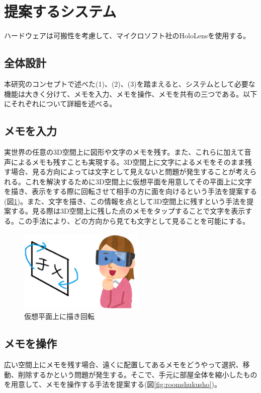 \documentclass[twocolumn, a4paper]{UECIEresume}
\begin{document}
\section{提案するシステム}
ハードウェアは可搬性を考慮して、マイクロソフト社のHoloLens\cite{tex6}を使用する。

\subsection{全体設計}
本研究のコンセプトで述べた(1)、(2)、(3)を踏まえると、システムとして必要な機能は大きく分けて、メモを入力、メモを操作、メモを共有の三つである。以下にそれぞれについて詳細を述べる。

\subsection{メモを入力}
実世界の任意の3D空間上に図形や文字のメモを残す。また、これらに加えて音声によるメモも残すことも実現する。3D空間上に文字によるメモをそのまま残す場合、見る方向によっては文字として見えないと問題が発生することが考えられる。これを解決するために3D空間上に仮想平面を用意してその平面上に文字を描き、表示をする際に回転させて相手の方に面を向けるという手法を提案する(図\ref{fig:memokaiten})。また、文字を描き、この情報を点として3D空間上に残すという手法を提案する。見る際は3D空間上に残した点のメモをタップすることで文字を表示する。この手法により、どの方向から見ても文字として見ることを可能にする。

\begin{figure}[h]
  \begin{center}
    \includegraphics[clip,height=4.0cm,width=6.0cm]{./memokaiten.eps}
    \caption{仮想平面上に描き回転}
    \label{fig:memokaiten}
  \end{center}
\end{figure}


\subsection{メモを操作}
広い空間上にメモを残す場合、遠くに配置してあるメモをどうやって選択、移動、削除するかという問題が発生する。そこで、手元に部屋全体を縮小したものを用意して、メモを操作する手法を提案する(図\ref{fig:roomshukusho})。
\end{document}
